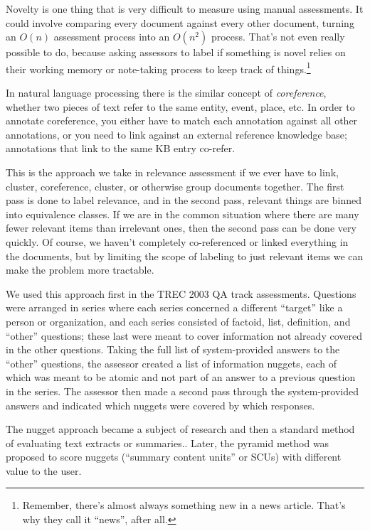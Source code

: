 \documentclass[nobib]{tufte-book}
\begin{document}
Novelty is one thing that is very difficult to measure using manual assessments.  It could involve comparing every document against every other document, turning an $O(n)$ assessment process into an $O(n^2)$ process. That's not even really possible to do, because asking assessors to label if something is novel relies on their working memory or note-taking process to keep track of things.\footnote{Remember, there's almost always something new in a news article. That's why they call it ``news'', after all.}

In natural language processing there is the similar concept of {\em coreference}, whether two pieces of text refer to the same entity, event, place, etc.  In order to annotate coreference, you either have to match each annotation against all other annotations, or you need to link against an external reference knowledge base; annotations that link to the same KB entry co-refer.

This is the approach we take in relevance assessment if we ever have to link, cluster, coreference, cluster, or otherwise group documents together.  The first pass is done to label relevance, and in the second pass, relevant things are binned into equivalence classes.  If we are in the common situation where there are many fewer relevant items than irrelevant ones, then the second pass can be done very quickly.  Of course, we haven't completely co-referenced or linked everything in the documents, but by limiting the scope of labeling to just relevant items we can make the problem more tractable.

We used this approach first in the TREC 2003 QA track assessments.\autocite{voorhees_overview_2004}  Questions were arranged in series where each series concerned a different ``target'' like a person or organization, and each series consisted of factoid, list, definition, and ``other'' questions; these last were meant to cover information not already covered in the other questions.  Taking the full list of system-provided answers to the ``other'' questions, the assessor created a list of information nuggets, each of which was meant to be atomic and not part of an answer to a previous question in the series.  The assessor then made a second pass through the system-provided answers and indicated which nuggets were covered by which responses.

The nugget approach became a subject of research and then a standard method of evaluating text extracts or summaries.\autocite{lin_evaluating_2005}.  Later, the pyramid method was proposed to score nuggets (``summary content units'' or SCUs) with different value to the user.\autocite{nenkova_pyramid_2007} 
\end{document}
